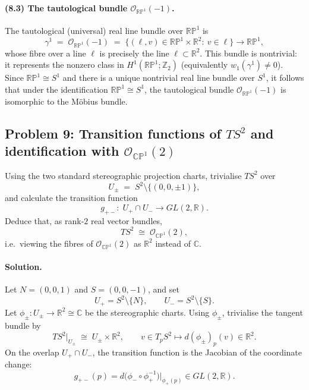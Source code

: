 \documentclass[12pt,a4paper]{article}
\theoremstyle{plain}
\theoremstyle{definition}      %
\begin{document}
\paragraph{(8.3) The tautological bundle $\mathcal{O}_{\mathbb{RP}^1}(-1)$.}
The tautological (universal) real line bundle over $\mathbb{RP}^1$ is
\[
\gamma^1 \;=\; \mathcal{O}_{\mathbb{RP}^1}(-1)
\;=\; \{(\ell,v)\in \mathbb{RP}^1\times \mathbb{R}^2:\ v\in \ell\}\longrightarrow \mathbb{RP}^1,
\]
whose fibre over a line $\ell$ is precisely the line $\ell\subset \mathbb{R}^2$.
This bundle is nontrivial: it represents the nonzero class in $H^1(\mathbb{RP}^1;\mathbb{Z}_2)$
(equivalently $w_1(\gamma^1)\neq 0$). Since $\mathbb{RP}^1\cong S^1$ and there is a unique nontrivial
real line bundle over $S^1$, it follows that under the identification $\mathbb{RP}^1\cong S^1$,
the tautological bundle $\mathcal{O}_{\mathbb{RP}^1}(-1)$ is isomorphic to the Möbius bundle.


\subsection*{Problem 9: Transition functions of $TS^2$ and identification with $\mathcal{O}_{\mathbb{CP}^1}(2)$}

\noindent Using the two standard stereographic projection charts, trivialise $TS^2$ over
\[
U_\pm \;=\; S^2\setminus\{(0,0,\pm 1)\},
\]
and calculate the transition function
\[
g_{+-}:\; U_+\cap U_- \longrightarrow GL(2,\mathbb{R}).
\]
Deduce that, as rank-$2$ real vector bundles,
\[
TS^2 \;\cong\; \mathcal{O}_{\mathbb{CP}^1}(2),
\]
i.e.\ viewing the fibres of $\mathcal{O}_{\mathbb{CP}^1}(2)$ as $\mathbb{R}^2$ instead of $\mathbb{C}$.



\paragraph{\textbf{Solution.}}
Let $N=(0,0,1)$ and $S=(0,0,-1)$, and set
\[
U_+ = S^2\setminus\{N\},\qquad U_- = S^2\setminus\{S\}.
\]
Let $\phi_\pm:U_\pm\to \mathbb{R}^2\cong\mathbb{C}$ be the stereographic charts.
Using $\phi_\pm$, trivialise the tangent bundle by
\[
TS^2|_{U_\pm}\;\cong\; U_\pm\times \mathbb{R}^2,\qquad
v\in T_pS^2\longmapsto d(\phi_\pm)_p(v)\in \mathbb{R}^2.
\]
On the overlap $U_+\cap U_-$, the transition function is the Jacobian of the coordinate change:
\[
g_{+-}(p)=d\bigl(\phi_-\circ \phi_+^{-1}\bigr)\Big|_{\phi_+(p)}\in GL(2,\mathbb{R}).
\]
\end{document}
